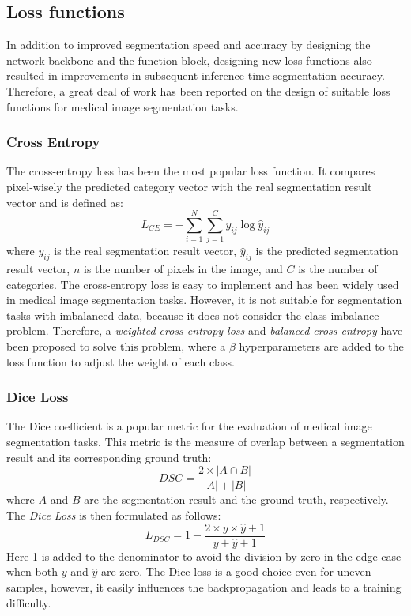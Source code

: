 \subsection{Loss functions}
In addition to improved segmentation speed and accuracy
by designing the network backbone and the function block, designing new loss
functions also resulted in improvements in subsequent inference-time
segmentation accuracy. Therefore,
a great deal of work has been reported on the design of
suitable loss functions for medical image segmentation tasks.

\subsubsection{Cross Entropy}
The cross-entropy loss has been the most popular loss function. It compares
pixel-wisely the predicted category vector with the real segmentation result
vector and is defined as:
$$
L_{CE} = -\sum_{i=1}^{N} \sum_{j=1}^{C} y_{ij} \log \hat{y}_{ij}
$$
where $y_{ij}$ is the real segmentation result vector, $\hat{y}_{ij}$ is the
predicted segmentation result vector, $n$ is the number of pixels in the image,
and $C$ is the number of categories. The cross-entropy loss is easy to
implement and has been widely used in medical image segmentation tasks. However,
it is not suitable for segmentation tasks with imbalanced data, because it does
not consider the class imbalance problem. Therefore, a \emph{weighted cross
entropy loss} and \emph{balanced cross entropy} have been proposed to solve this
problem, where a $\beta$ hyperparameters are added to the loss function to adjust
the weight of each class.

\subsubsection{Dice Loss}
The Dice coefficient is a popular metric for the evaluation of medical image
segmentation tasks. This metric is the measure of overlap between a segmentation
result and its corresponding ground truth:
$$
DSC = \frac{2 \times |A \cap B|}{|A| + |B|}
$$
where $A$ and $B$ are the segmentation result and the ground truth,
respectively. The \emph{Dice Loss} is then formulated as follows:
$$
L_{DSC} = 1 - \frac{2 \times y \times \hat{y} + 1}{y + \hat{y} + 1}
$$
Here 1 is added to the denominator to avoid the division by zero in the edge
case when both $y$ and $\hat{y}$ are zero. The Dice loss is a good choice even
for uneven samples, however, it easily influences the backpropagation and leads
  to a training difficulty.

